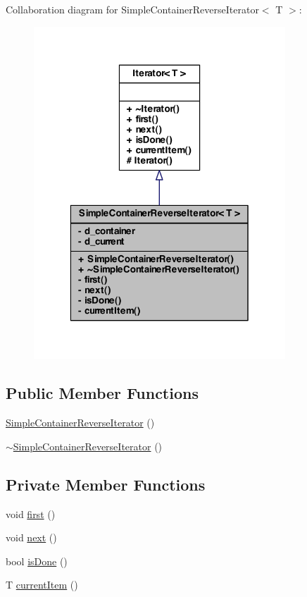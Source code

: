 Collaboration diagram for SimpleContainerReverseIterator$<$ T $>$:\nopagebreak
\begin{figure}[H]
\begin{center}
\leavevmode
\includegraphics[width=268pt]{class_simple_container_reverse_iterator__coll__graph}
\end{center}
\end{figure}
\subsection*{Public Member Functions}
\begin{DoxyCompactItemize}
\item 
\hyperlink{class_simple_container_reverse_iterator_ad1c274dfa9002cc1a08f510bc21504de}{SimpleContainerReverseIterator} ()
\item 
\hyperlink{class_simple_container_reverse_iterator_a404410696e7250442de38d637306f8dd}{$\sim$SimpleContainerReverseIterator} ()
\end{DoxyCompactItemize}
\subsection*{Private Member Functions}
\begin{DoxyCompactItemize}
\item 
void \hyperlink{class_simple_container_reverse_iterator_a668e22d824eca8ec3cb3a49765012c52}{first} ()
\item 
void \hyperlink{class_simple_container_reverse_iterator_a21346e891b30bd217d7ca5aa51622dbe}{next} ()
\item 
bool \hyperlink{class_simple_container_reverse_iterator_aaad6fe33e00ead55155f42bfbbe8ea04}{isDone} ()
\item 
T \hyperlink{class_simple_container_reverse_iterator_a5930732e1d179eeccbbfd44f0287eecb}{currentItem} ()
\end{DoxyCompactItemize}
